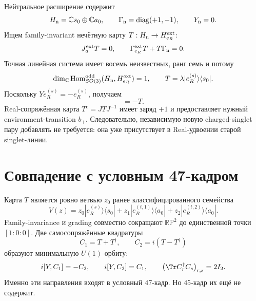 Нейтральное расширение содержит
\begin{equation}
 H_{\rm n}=\mathbb C s_0\oplus\mathbb C a_0,
 \qquad \Gamma_{\rm n}=\operatorname{diag}(+1,-1),
 \qquad Y_{\rm n}=0.
 \label{eq:v8-mediator-existing-neutral-source}
\end{equation}
Ищем family-invariant нечётную карту $T:H_{\rm n}\to H_{e_R}^{\rm ext}$:
\begin{equation}
 J_a^{\rm ext}T=0,\qquad
 \Gamma_{e_R}^{\rm ext}T+T\Gamma_{\rm n}=0.
 \label{eq:v8-mediator-existing-intertwiner-system}
\end{equation}
Точная линейная система имеет восемь неизвестных, ранг семь и потому
\begin{equation}
 \dim_{\mathbb C}\operatorname{Hom}_{SO(3)}^{\rm odd}
 (H_{\rm n},H_{e_R}^{\rm ext})=1,
 \qquad
 T=\lambda |e_R^{(s)}\rangle\langle s_0|.
 \label{eq:v8-mediator-existing-unique-odd-hom}
\end{equation}
Поскольку $Y e_R^{(s)}=-e_R^{(s)}$, получаем
\begin{equation}
 [Y,T]=-T.
 \label{eq:v8-mediator-existing-charge-minus}
\end{equation}
Real-сопряжённая карта $T^c=JTJ^{-1}$ имеет заряд $+1$ и предоставляет
нужный environment-transition $b_+$. Следовательно, независимую новую
charged-singlet пару добавлять не требуется: она уже присутствует в
Real-удвоении старой singlet-линии.

\section{Совпадение с условным 47-кадром}

Карта $T$ является ровно ветвью $z_0$ ранее классифицированного семейства
\begin{equation}
 V(z)=z_0|e_R^{(s)}\rangle\langle s_0|
 +z_1|e_R^{(t,1)}\rangle\langle a_0|
 +z_2|e_R^{(t,2)}\rangle\langle a_0|.
 \label{eq:v8-mediator-existing-vz-family}
\end{equation}
Family-invariance и grading совместно сокращают $\mathbb{RP}^2$ до
единственной точки $[1:0:0]$. Две самосопряжённые квадратуры
\begin{equation}
 C_1=T+T^\dagger,\qquad
 C_2=i(T-T^\dagger)
 \label{eq:v8-mediator-existing-quadratures}
\end{equation}
образуют минимальную $U(1)$-орбиту:
\begin{equation}
 i[Y,C_1]=-C_2,\qquad i[Y,C_2]=C_1,
 \qquad
 \bigl(\Tr C_r^\dagger C_s\bigr)_{r,s}=2I_2.
 \label{eq:v8-mediator-existing-u1-gram}
\end{equation}
Именно эти направления входят в условный $47$-кадр. Но $45$-кадр их ещё
не содержит.

